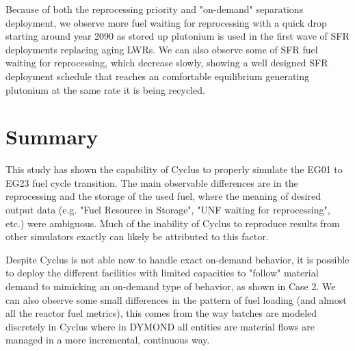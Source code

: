 \documentclass[12pt]{article}
\begin{document}
Because of both the reprocessing priority and "on-demand" separations
deployment, we observe more fuel waiting for reprocessing with a quick drop
starting around year 2090 as stored up plutonium is used in the first wave of
SFR deployments replacing aging LWRs.  We can also observe some of SFR fuel
waiting for reprocessing, which decrease slowly, showing a well designed SFR
deployment schedule that reaches an comfortable equilibrium generating
plutonium at the same rate it is being recycled.

\section{Summary}

This study has shown the capability of Cyclus to properly simulate the EG01 to
EG23 fuel cycle transition.  The main observable differences are in the
reprocessing and the storage of the used fuel, where the meaning of desired
output data (e.g. "Fuel Resource in Storage", "UNF waiting for reprocessing",
etc.) were ambiguous.  Much of the inability of Cyclus to reproduce results
from other simulators exactly can likely be attributed to this factor.

Despite Cyclus is not able now to handle exact on-demand behavior, it is
possible to deploy the different facilities with limited capacities to
"follow" material demand to mimicking an on-demand type of behavior, as shown
in Case 2.  We can also observe some small differences in the pattern of fuel
loading (and almost all the reactor fuel metrics), this comes from the way
batches are modeled discretely in Cyclus where in DYMOND all entities are
material flows are managed in a more incremental, continuous way.






\end{document}
